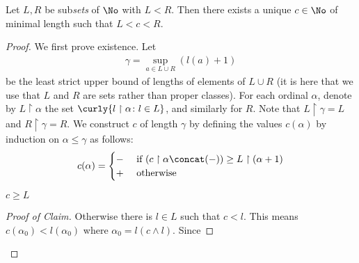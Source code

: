 \begin{theorem}
	Let $L, R$ be sub\emph{sets} of $\No$ with $L < R$. 
	Then there exists a unique $c \in \No$ of minimal length 
	such that $L < c < R$. 
	\label{}
\end{theorem}
\begin{proof}
%
	We first prove existence. Let 
	\begin{align*}
		\gamma = \sup_{a \in L \cup R}{(l(a) + 1)}
	\end{align*}
	be the least strict upper bound of lengths of elements of 
	$L \cup R$ (it is here that we use that $L$ and $R$ are sets 
	rather than proper classes). For each ordinal $\alpha$, 
	denote by $L\restriction \alpha$ the set  $\curly{l \restriction \alpha 
	\colon l \in L}$, and similarly for $R$. Note that 
	$L \restriction \gamma = L$ and $R \restriction \gamma = R$. 	
	We construct $c$ of length $\gamma$ by defining the 
	values $c(\alpha)$ by induction on 
	$\alpha \leq \gamma$ as follows: 
	\begin{align*}
		c(\alpha) = 
		\begin{cases}
			- & \text{ if } 
			(c \restriction \alpha \concat (-) ) \geq 
			L \restriction (\alpha + 1) \\
			+ & \text{ otherwise}
		\end{cases}
	\end{align*}
	\begin{claim}
		$c \geq L$
	\end{claim}
	\begin{proof}[Proof of Claim]
		Otherwise there is $l \in L$ such that 
		$c < l$. This means $c(\alpha_0) < l(\alpha_0)$
		where $\alpha_0 = l(c \wedge l)$. Since 

\end{proof}
\end{proof}
